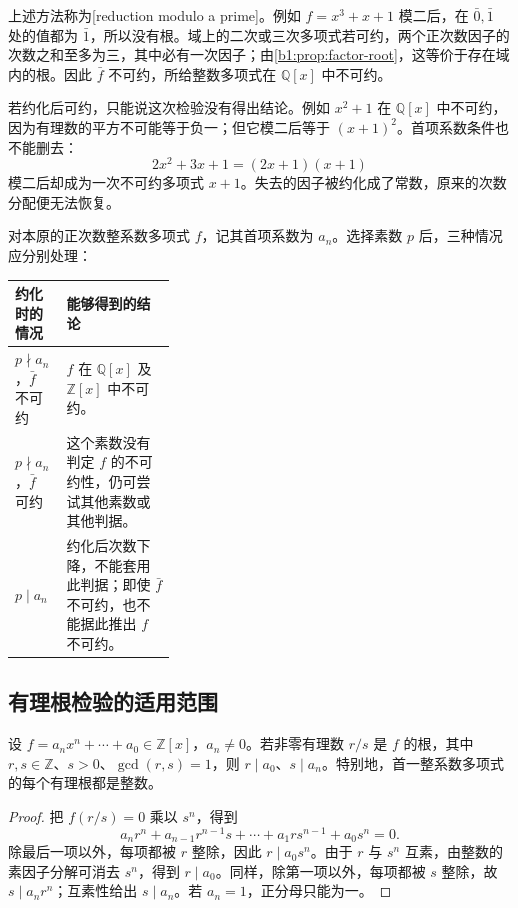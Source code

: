 上述方法称为[reduction modulo a prime]。例如 \(f=x^3+x+1\) 模二后，在 \(\bar0,\bar1\) 处的值都为 \(\bar1\)，所以没有根。域上的二次或三次多项式若可约，两个正次数因子的次数之和至多为三，其中必有一次因子；由\cref{b1:prop:factor-root}，这等价于存在域内的根。因此 \(\bar f\) 不可约，所给整数多项式在 \(\mathbb Q[x]\) 中不可约。

\ProseParagraphBreak
若约化后可约，只能说这次检验没有得出结论。例如 \(x^2+1\) 在 \(\mathbb Q[x]\) 中不可约，因为有理数的平方不可能等于负一；但它模二后等于 \((x+1)^2\)。首项系数条件也不能删去：
\[
	2x^2+3x+1=(2x+1)(x+1)
\]
模二后却成为一次不可约多项式 \(x+1\)。失去的因子被约化成了常数，原来的次数分配便无法恢复。

\ProseParagraphBreak
对本原的正次数整系数多项式 \(f\)，记其首项系数为 \(a_n\)。选择素数 \(p\) 后，三种情况应分别处理：
\begin{center}
	\begin{tabularx}{\linewidth}{@{}p{0.32\linewidth}X@{}}
		\toprule
		约化时的情况 & 能够得到的结论 \\
		\midrule
		\(p\nmid a_n\)，\(\bar f\) 不可约 & \(f\) 在 \(\mathbb Q[x]\) 及 \(\mathbb Z[x]\) 中不可约。 \\
		\(p\nmid a_n\)，\(\bar f\) 可约 & 这个素数没有判定 \(f\) 的不可约性，仍可尝试其他素数或其他判据。 \\
		\(p\mid a_n\) & 约化后次数下降，不能套用此判据；即使 \(\bar f\) 不可约，也不能据此推出 \(f\) 不可约。 \\
		\bottomrule
	\end{tabularx}
\end{center}

\subsection{有理根检验的适用范围}
\label{b1:subsec:1203:03}

\begin{proposition}[有理根检验]\label{b1:prop:rational-root}
	设 \(f=a_nx^n+\cdots+a_0\in\mathbb Z[x]\)，\(a_n\ne0\)。若非零有理数 \(r/s\) 是 \(f\) 的根，其中 \(r,s\in\mathbb Z\)、\(s>0\)、\(\gcd(r,s)=1\)，则 \(r\mid a_0\)、\(s\mid a_n\)。特别地，首一整系数多项式的每个有理根都是整数。
\end{proposition}
\begin{proof}
	把 \(f(r/s)=0\) 乘以 \(s^n\)，得到
	\[
		a_nr^n+a_{n-1}r^{n-1}s+\cdots+a_1rs^{n-1}+a_0s^n=0.
	\]
	除最后一项以外，每项都被 \(r\) 整除，因此 \(r\mid a_0s^n\)。由于 \(r\) 与 \(s^n\) 互素，由整数的素因子分解可消去 \(s^n\)，得到 \(r\mid a_0\)。同样，除第一项以外，每项都被 \(s\) 整除，故 \(s\mid a_nr^n\)；互素性给出 \(s\mid a_n\)。若 \(a_n=1\)，正分母只能为一。
\end{proof}

